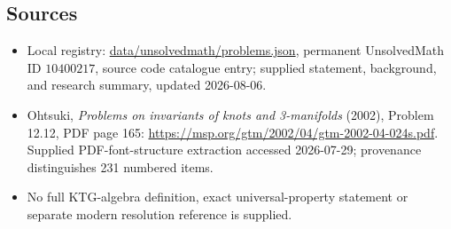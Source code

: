 \documentclass[11pt]{article}
\begin{document}
\subsection{Sources}
\begin{itemize}
\item Local registry: \url{data/unsolvedmath/problems.json}, permanent UnsolvedMath ID \(10400217\), source code catalogue entry; supplied statement, background, and research summary, updated 2026-08-06.
\item Ohtsuki, \emph{Problems on invariants of knots and 3-manifolds} (2002), Problem 12.12, PDF page 165: \url{https://msp.org/gtm/2002/04/gtm-2002-04-024s.pdf}. Supplied PDF-font-structure extraction accessed 2026-07-29; provenance distinguishes 231 numbered items.
\item No full KTG-algebra definition, exact universal-property statement or separate modern resolution reference is supplied.
\end{itemize}
\end{document}
